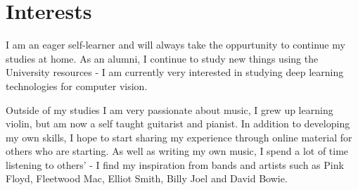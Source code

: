 \documentclass[letterpaper]{twentysecondcv} %
\begin{document}


\section*{Interests}


I am an eager self-learner and will always take the oppurtunity to continue my studies at home. As an alumni, I continue to study new things using the University resources - I am currently very interested in studying deep learning technologies for computer vision.

Outside of my studies I am very passionate about music, I grew up learning violin, but am now a self taught guitarist and pianist. In addition to developing my own skills, I hope to start sharing my experience through online material for others who are starting. As well as writing my own music, I spend a lot of time listening to others' - I find my inspiration from bands and artists such as Pink Floyd, Fleetwood Mac, Elliot Smith, Billy Joel and David Bowie.





\end{document}
